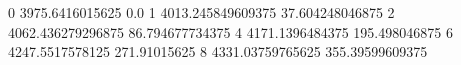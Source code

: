 0 3975.6416015625 0.0
1 4013.245849609375 37.604248046875
2 4062.436279296875 86.794677734375
4 4171.1396484375 195.498046875
6 4247.5517578125 271.91015625
8 4331.03759765625 355.39599609375

